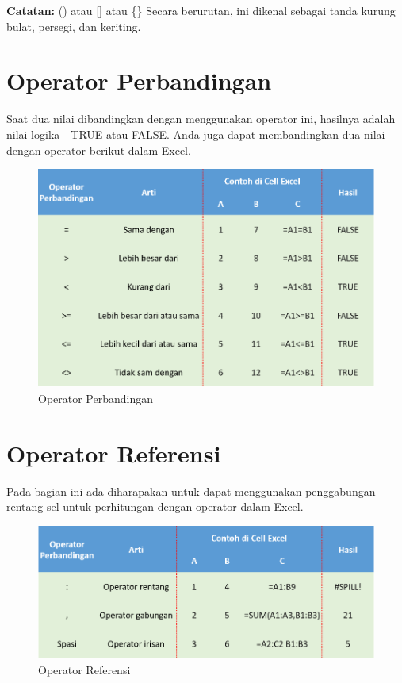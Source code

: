 \documentclass[
]{book}
\begin{document}
\textbf{Catatan:} () atau {[}{]} atau \{\} Secara berurutan, ini dikenal sebagai tanda kurung bulat, persegi, dan keriting.

\hypertarget{operator-perbandingan}{%
\section{Operator Perbandingan}\label{operator-perbandingan}}

Saat dua nilai dibandingkan dengan menggunakan operator ini, hasilnya adalah nilai logika---TRUE atau FALSE. Anda juga dapat membandingkan dua nilai dengan operator berikut dalam Excel.

\begin{figure}

{\centering \includegraphics[width=0.75\linewidth]{images/perbandingan} 

}

\caption{Operator Perbandingan}\label{fig:perbandingan}
\end{figure}

\hypertarget{operator-referensi}{%
\section{Operator Referensi}\label{operator-referensi}}

Pada bagian ini ada diharapakan untuk dapat menggunakan penggabungan rentang sel untuk perhitungan dengan operator dalam Excel.

\begin{figure}

{\centering \includegraphics[width=0.75\linewidth]{images/referensi} 

}

\caption{Operator Referensi}\label{fig:referensi}
\end{figure}
\end{document}
